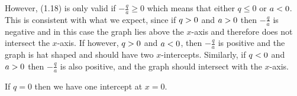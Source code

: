          
          \label{m39345*id243360}However, (1.18) is only valid if \begin{math}-\frac{q}{a}\ge 0\end{math} which means that either \begin{math}q\le 0\end{math} or \begin{math}a<{}0\end{math}. This is consistent with what we expect, since if \begin{math}q>{}0\end{math} and \begin{math}a>{}0\end{math} then \begin{math}-\frac{q}{a}\end{math} is negative and in this case the graph lies above the \begin{math}x\end{math}-axis and therefore does not intersect the \begin{math}x\end{math}-axis. If however, \begin{math}q>{}0\end{math} and \begin{math}a<{}0\end{math}, then \begin{math}-\frac{q}{a}\end{math} is positive and the graph is hat shaped and should have two \begin{math}x\end{math}-intercepts. Similarly, if \begin{math}q<{}0\end{math} and \begin{math}a>{}0\end{math} then \begin{math}-\frac{q}{a}\end{math} is also positive, and the graph should intersect with the \begin{math}x\end{math}-axis.\par 
          \label{m39345*id243593}If \begin{math}q=0\end{math} then we have one intercept at \begin{math}x=0\end{math}.\par 

